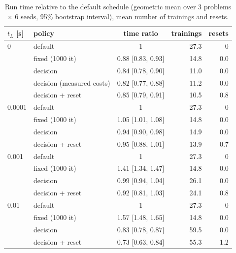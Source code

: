 \begin{table}[htbp]\centering
\caption{Run time relative to the default schedule (geometric mean over 3 problems $\times$ 6 seeds, 95\% bootstrap interval), mean number of trainings and resets.}
\label{tab:results}
\begin{tabular}{llcrr}
\toprule
$t_L$ [s] & policy & time ratio & trainings & resets \\
\midrule
0 & default & 1 & 27.3 & 0 \\
 & fixed (1000 it) & 0.88 [0.83, 0.93] & 14.8 & 0.0 \\
 & decision & 0.84 [0.78, 0.90] & 11.0 & 0.0 \\
 & decision (measured costs) & 0.82 [0.77, 0.88] & 11.2 & 0.0 \\
 & decision + reset & 0.85 [0.79, 0.91] & 10.5 & 0.8 \\
\midrule
0.0001 & default & 1 & 27.3 & 0 \\
 & fixed (1000 it) & 1.05 [1.01, 1.08] & 14.8 & 0.0 \\
 & decision & 0.94 [0.90, 0.98] & 14.9 & 0.0 \\
 & decision + reset & 0.95 [0.88, 1.01] & 13.9 & 0.7 \\
\midrule
0.001 & default & 1 & 27.3 & 0 \\
 & fixed (1000 it) & 1.41 [1.34, 1.47] & 14.8 & 0.0 \\
 & decision & 0.99 [0.94, 1.04] & 26.1 & 0.0 \\
 & decision + reset & 0.92 [0.81, 1.03] & 24.1 & 0.8 \\
\midrule
0.01 & default & 1 & 27.3 & 0 \\
 & fixed (1000 it) & 1.57 [1.48, 1.65] & 14.8 & 0.0 \\
 & decision & 0.83 [0.78, 0.87] & 59.5 & 0.0 \\
 & decision + reset & 0.73 [0.63, 0.84] & 55.3 & 1.2 \\
\bottomrule
\end{tabular}
\end{table}